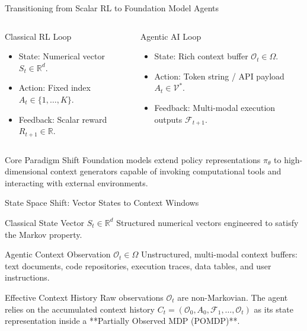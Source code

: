 \documentclass[10pt, aspectratio=169]{beamer}
\begin{document}
\begin{frame}{Transitioning from Scalar RL to Foundation Model Agents}
  \begin{columns}
    \begin{block}{Classical RL Loop}
      \begin{itemize}
        \item State: Numerical vector $S_t \in \mathbb{R}^d$.
        \item Action: Fixed index $A_t \in \{1,\dots,K\}$.
        \item Feedback: Scalar reward $R_{t+1} \in \mathbb{R}$.
      \end{itemize}
    \end{block}

    \begin{block}{Agentic AI Loop}
      \begin{itemize}
        \item State: Rich context buffer $\mathcal{O}_t \in \Omega$.
        \item Action: Token string / API payload $A_t \in \mathcal{V}^*$.
        \item Feedback: Multi-modal execution outputs $\mathcal{F}_{t+1}$.
      \end{itemize}
    \end{block}
  \end{columns}

  \begin{block}{Core Paradigm Shift}
    Foundation models extend policy representations $\pi_\theta$ to high-dimensional context generators capable of invoking computational tools and interacting with external environments.
  \end{block}
\end{frame}

\begin{frame}{State Space Shift: Vector States to Context Windows}
  \begin{block}{Classical State Vector $S_t \in \mathbb{R}^d$}
    Structured numerical vectors engineered to satisfy the Markov property.
  \end{block}

  \begin{block}{Agentic Context Observation $\mathcal{O}_t \in \Omega$}
    Unstructured, multi-modal context buffers: text documents, code repositories, execution traces, data tables, and user instructions.
  \end{block}

  \begin{block}{Effective Context History}
    Raw observations $\mathcal{O}_t$ are non-Markovian. The agent relies on the accumulated context history $C_t = (\mathcal{O}_0, A_0, \mathcal{F}_1, \dots, \mathcal{O}_t)$ as its state representation inside a **Partially Observed MDP (POMDP)**.
  \end{block}
\end{frame}
\end{document}
